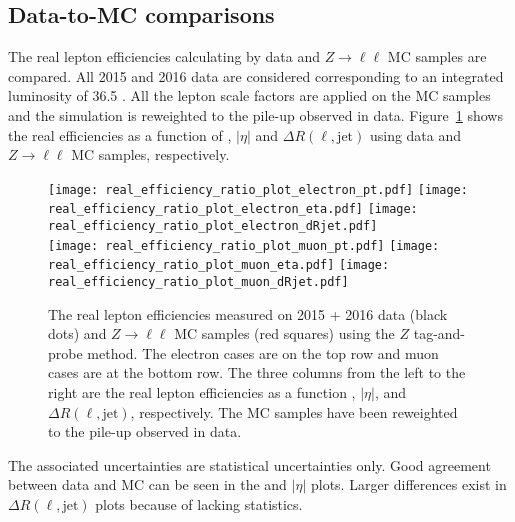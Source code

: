 
\subsection{Data-to-MC comparisons}
\label{subsec:app_RLE_data_to_mc_comparisons}
The real lepton efficiencies calculating by data and $Z\to \ell\ell$ MC samples are compared.
All 2015 and 2016 data are considered corresponding to an integrated luminosity of 36.5 \ifb.
All the lepton scale factors are applied on the MC samples and the simulation is reweighted to the pile-up observed in data.
Figure~\ref{fig:app_RLE_real_efficiency_pt_eta_dRjet} shows the real efficiencies as a function of \pt, $|\eta|$ and $\Delta R(\ell, \mathrm{jet})$ using data and $Z\to \ell \ell$ MC samples, respectively.
%
\begin{figure}[htbp]
    \texttt{[image: real\_efficiency\_ratio\_plot\_electron\_pt.pdf]}
    \texttt{[image: real\_efficiency\_ratio\_plot\_electron\_eta.pdf]}
    \texttt{[image: real\_efficiency\_ratio\_plot\_electron\_dRjet.pdf]}\\
    \texttt{[image: real\_efficiency\_ratio\_plot\_muon\_pt.pdf]}
    \texttt{[image: real\_efficiency\_ratio\_plot\_muon\_eta.pdf]}
    \texttt{[image: real\_efficiency\_ratio\_plot\_muon\_dRjet.pdf]}
    \caption{The real lepton efficiencies measured on 2015 + 2016 data (black dots) and $Z\to \ell\ell$ MC samples (red squares) using the $Z$ tag-and-probe method.
    The electron cases are on the top row and muon cases are at the bottom row.
    The three columns from the left to the right are the real lepton efficiencies as a function \pt, $|\eta|$, and $\Delta R(\ell, \mathrm{jet})$, respectively.
    The MC samples have been reweighted to the pile-up observed in data.}
    \label{fig:app_RLE_real_efficiency_pt_eta_dRjet}
\end{figure}
%
The associated uncertainties are statistical uncertainties only.
Good agreement between data and MC can be seen in the \pt and $|\eta|$ plots.
Larger differences exist in $\Delta R(\ell, \mathrm{jet})$ plots because of lacking statistics.


